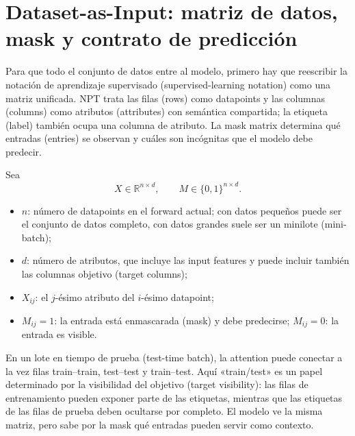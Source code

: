 \section{Dataset-as-Input: matriz de datos, mask y contrato de predicción}

Para que todo el conjunto de datos entre al modelo, primero hay que reescribir la notación de aprendizaje supervisado (supervised-learning notation) como una matriz unificada. NPT trata las filas (rows) como datapoints y las columnas (columns) como atributos (attributes) con semántica compartida; la etiqueta (label) también ocupa una columna de atributo. La mask matrix determina qué entradas (entries) se observan y cuáles son incógnitas que el modelo debe predecir.


Sea
\[
X\in\mathbb{R}^{n\times d},\qquad M\in\{0,1\}^{n\times d}.
\]

\begin{itemize}
  \item $n$: número de datapoints en el forward actual; con datos pequeños puede ser el conjunto de datos completo, con datos grandes suele ser un minilote (mini-batch);
  \item $d$: número de atributos, que incluye las input features y puede incluir también las columnas objetivo (target columns);
  \item $X_{ij}$: el $j$-ésimo atributo del $i$-ésimo datapoint;
  \item $M_{ij}=1$: la entrada está enmascarada (mask) y debe predecirse; $M_{ij}=0$: la entrada es visible.
\end{itemize}


En un lote en tiempo de prueba (test-time batch), la attention puede conectar a la vez filas train--train, test--test y train--test. Aquí «train/test» es un papel determinado por la visibilidad del objetivo (target visibility): las filas de entrenamiento pueden exponer parte de las etiquetas, mientras que las etiquetas de las filas de prueba deben ocultarse por completo. El modelo ve la misma matriz, pero sabe por la mask qué entradas pueden servir como contexto.

